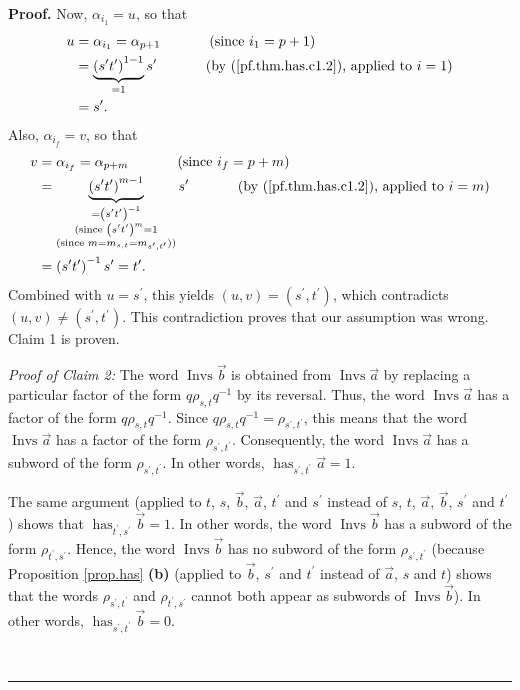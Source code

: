 \documentclass
[numbers=enddot,12pt,final,onecolumn,notitlepage,abstracton]{scrartcl}%
\theoremstyle{definition}
\newenvironment{proof}[1][Proof]{\noindent\textbf{#1.} }{\ \rule{0.5em}{0.5em}}
\begin{document}
\begin{proof}
Now, $\alpha_{i_{1}}=u$, so that%
\begin{align*}
u  &  =\alpha_{i_{1}}=\alpha_{p+1}\ \ \ \ \ \ \ \ \ \ \left(  \text{since
}i_{1}=p+1\right) \\
&  =\underbrace{\left(  s^{\prime}t^{\prime}\right)  ^{1-1}}_{=1}s^{\prime
}\ \ \ \ \ \ \ \ \ \ \left(  \text{by (\ref{pf.thm.has.c1.2}), applied to
}i=1\right) \\
&  =s^{\prime}.
\end{align*}
Also, $\alpha_{i_{f}}=v$, so that%
\begin{align*}
v  &  =\alpha_{i_{f}}=\alpha_{p+m}\ \ \ \ \ \ \ \ \ \ \left(  \text{since
}i_{f}=p+m\right) \\
&  =\underbrace{\left(  s^{\prime}t^{\prime}\right)  ^{m-1}}%
_{\substack{=\left(  s^{\prime}t^{\prime}\right)  ^{-1}\\\text{(since }\left(
s^{\prime}t^{\prime}\right)  ^{m}=1\\\text{(since }m=m_{s,t}=m_{s^{\prime
},t^{\prime}}\text{))}}}s^{\prime}\ \ \ \ \ \ \ \ \ \ \left(  \text{by
(\ref{pf.thm.has.c1.2}), applied to }i=m\right) \\
&  =\left(  s^{\prime}t^{\prime}\right)  ^{-1}s^{\prime}=t^{\prime}.
\end{align*}
Combined with $u=s^{\prime}$, this yields $\left(  u,v\right)  =\left(
s^{\prime},t^{\prime}\right)  $, which contradicts $\left(  u,v\right)
\neq\left(  s^{\prime},t^{\prime}\right)  $. This contradiction proves that
our assumption was wrong. Claim 1 is proven.

\textit{Proof of Claim 2:} The word $\operatorname*{Invs}\overrightarrow{b}$
is obtained from $\operatorname*{Invs}\overrightarrow{a}$ by replacing a
particular factor of the form $q\rho_{s,t}q^{-1}$ by its reversal. Thus, the
word $\operatorname*{Invs}\overrightarrow{a}$ has a factor of the form
$q\rho_{s,t}q^{-1}$. Since $q\rho_{s,t}q^{-1}=\rho_{s^{\prime},t^{\prime}}$,
this means that the word $\operatorname*{Invs}\overrightarrow{a}$ has a factor
of the form $\rho_{s^{\prime},t^{\prime}}$. Consequently, the word
$\operatorname*{Invs}\overrightarrow{a}$ has a subword of the form
$\rho_{s^{\prime},t^{\prime}}$. In other words, $\operatorname*{has}%
\nolimits_{s^{\prime},t^{\prime}}\overrightarrow{a}=1$.

The same argument (applied to $t$, $s$, $\overrightarrow{b}$,
$\overrightarrow{a}$, $t^{\prime}$ and $s^{\prime}$ instead of $s$, $t$,
$\overrightarrow{a}$, $\overrightarrow{b}$, $s^{\prime}$ and $t^{\prime}$)
shows that $\operatorname*{has}\nolimits_{t^{\prime},s^{\prime}}%
\overrightarrow{b}=1$. In other words, the word $\operatorname*{Invs}%
\overrightarrow{b}$ has a subword of the form $\rho_{t^{\prime},s^{\prime}}$.
Hence, the word $\operatorname*{Invs}\overrightarrow{b}$ has no subword of the
form $\rho_{s^{\prime},t^{\prime}}$ (because Proposition \ref{prop.has}
\textbf{(b)} (applied to $\overrightarrow{b}$, $s^{\prime}$ and $t^{\prime}$
instead of $\overrightarrow{a}$, $s$ and $t$) shows that the words
$\rho_{s^{\prime},t^{\prime}}$ and $\rho_{t^{\prime},s^{\prime}}$ cannot both
appear as subwords of $\operatorname*{Invs}\overrightarrow{b}$). In other
words, $\operatorname*{has}\nolimits_{s^{\prime},t^{\prime}}\overrightarrow{b}%
=0$.


\end{proof}
\end{document}
